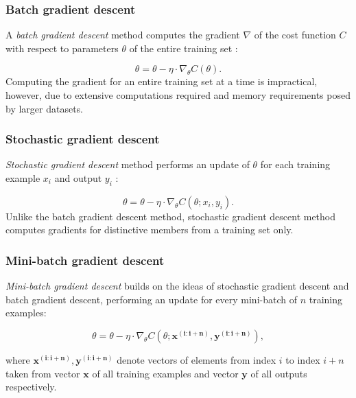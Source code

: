 \subsubsection{Batch gradient descent}

A \emph{batch gradient descent} method computes the gradient $\nabla$ of the cost function $C$ with respect to parameters $\theta$ of the entire training set \cite{gradient_descent_ruder}:

\begin{equation}
\theta = \theta - \eta \cdot \nabla_\theta C(\theta).
\end{equation}
Computing the gradient for an entire training set at a time is impractical, however, due to extensive computations required and memory requirements posed by larger datasets.

\subsubsection{Stochastic gradient descent}

\emph{Stochastic gradient descent} method performs an update of $\theta$ for each training example $x_i$ and output $y_i$ \cite{gradient_descent_ruder}:

\begin{equation}
\theta = \theta - \eta \cdot \nabla_\theta C(\theta; x_i, y_i).
\end{equation}
Unlike the batch gradient descent method, stochastic gradient descent method computes gradients for distinctive members from a training set only. 

\subsubsection{Mini-batch gradient descent}
\label{gradient:mini-batch}

\emph{Mini-batch gradient descent} builds on the ideas of stochastic gradient descent and batch gradient descent, performing an update for every mini-batch of $n$ training examples:

\begin{equation}
\theta = \theta - \eta \cdot \nabla_\theta C(\theta; \boldsymbol{x^{(i:i+n)}}, \boldsymbol{y^{(i:i+n)}}),
\end{equation}

where $\boldsymbol{x^{(i:i+n)}}, \boldsymbol{y^{(i:i+n)}}$  denote vectors of elements from index $i$ to index $i+n$ taken from vector $\boldsymbol{x}$ of all training examples and vector $\boldsymbol{y}$ of all outputs respectively.

